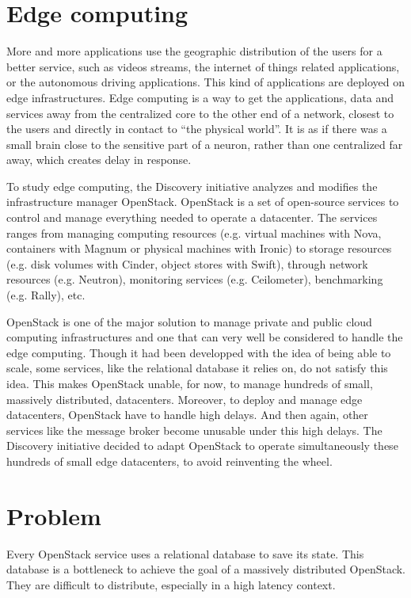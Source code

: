 \section{Edge computing}

More and more applications use the geographic distribution of the users for a better service, such as videos streams, the internet of things related applications, or the autonomous driving applications. This kind of applications are deployed on edge infrastructures. Edge computing is a way to get the applications, data and services away from the centralized core to the other end of a network, closest to the users and directly in contact to ``the physical world''. It is as if there was a small brain close to the sensitive part of a neuron, rather than one centralized far away, which creates delay in response.

To study edge computing, the Discovery initiative analyzes and modifies the infrastructure manager OpenStack. OpenStack is a set of open-source services to control and manage everything needed to operate a datacenter. The services ranges from managing computing resources (e.g. virtual machines with Nova, containers with Magnum or physical machines with Ironic) to storage resources (e.g. disk volumes with Cinder, object stores with Swift), through network resources (e.g. Neutron), monitoring services (e.g. Ceilometer), benchmarking (e.g. Rally), etc.

OpenStack is one of the major solution to manage private and public cloud computing infrastructures and one that can very well be considered to handle the edge computing. Though it had been developped with the idea of being able to scale, some services, like the relational database it relies on, do not satisfy this idea. This makes OpenStack unable, for now, to manage hundreds of small, massively distributed, datacenters. Moreover, to deploy and manage edge datacenters, OpenStack have to handle high delays. And then again, other services like the message broker become unusable under this high delays. The Discovery initiative decided to adapt OpenStack to operate simultaneously these hundreds of small edge datacenters, to avoid reinventing the wheel.



\section{Problem}

Every OpenStack service uses a relational database to save its state. This database is a bottleneck to achieve the goal of a massively distributed OpenStack. They are difficult to distribute, especially in a high latency context.

